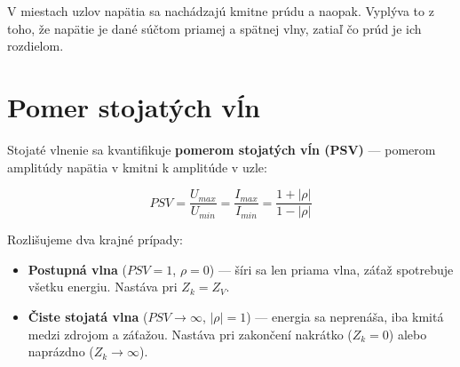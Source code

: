 V miestach uzlov napätia sa nachádzajú kmitne prúdu a naopak. Vyplýva to z toho, že napätie 
je dané súčtom priamej a spätnej vlny, zatiaľ čo prúd je ich rozdielom.

\section{Pomer stojatých vĺn}

Stojaté vlnenie sa kvantifikuje \textbf{pomerom stojatých vĺn (PSV)} 
— pomerom amplitúdy napätia v kmitni k amplitúde v uzle:

\begin{equation}
	PSV = \frac{U_{max}}{U_{min}} = \frac{I_{max}}{I_{min}} 
	= \frac{1 + |\rho|}{1 - |\rho|}
\end{equation}

Rozlišujeme dva krajné prípady:

\begin{itemize}
	\item \textbf{Postupná vlna} ($PSV = 1$, $\rho = 0$) — šíri sa 
	len priama vlna, záťaž spotrebuje všetku energiu. Nastáva 
	pri $Z_k = Z_V$.
	\item \textbf{Čiste stojatá vlna} ($PSV \to \infty$, $|\rho| = 1$) 
	— energia sa neprenáša, iba kmitá medzi zdrojom a záťažou. 
	Nastáva pri zakončení nakrátko ($Z_k = 0$) alebo 
	naprázdno ($Z_k \to \infty$).
\end{itemize}

